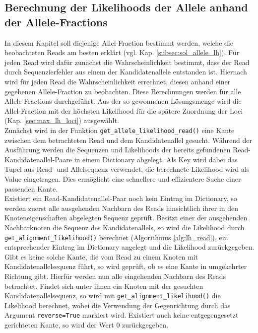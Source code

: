 \subsection{Berechnung der Likelihoods der Allele anhand der Allele-Fractions} \label{subsec:lh_allele}

In diesem Kapitel soll diejenige Allel-Fraction bestimmt werden, welche die beobachteten Reads am besten erklärt (vgl. Kap. \ref{subsec:sol_allele_lh}). Für jeden Read wird dafür zunächst die Wahrscheinlichkeit bestimmt, dass der Read durch Sequenzierfehler aus einem der Kandidatenallele entstanden ist. Hiernach wird für jeden Read die Wahrscheinlichkeit errechnet, diesen anhand einer gegebenen Allele-Fraction zu beobachten. Diese Berechnungen werden für alle Allele-Fractions durchgeführt. Aus der so gewonnenen Lösungsmenge wird die Allel-Fraction mit der höchsten Likelihood für die spätere Zuordnung der Loci (Kap. \ref{sec:max_lh_loci}) ausgewählt. \\ 

Zunächst wird in der Funktion \lstinline|get_allele_likelihood_read()| eine Kante zwischen dem betrachteten Read und dem Kandidatenallel gesucht. Während der Ausführung werden die Sequenzen und Likelihoods der bereits gefundenen Read-Kandidatenallel-Paare in einem Dictionary abgelegt. Als Key wird dabei das Tupel aus Read- und Allelsequenz verwendet, die berechnete Likelihood wird als Value eingetragen. Dies ermöglicht eine schnellere und effizientere Suche einer passenden Kante. \\

Existiert ein Read-Kandidatenallel-Paar noch kein Eintrag im Dictionary, so werden zuerst alle ausgehenden Nachbarn des Reads hinsichtlich ihrer in den Knoteneigenschaften abgelegten Sequenz geprüft. Besitzt einer der ausgehenden Nachbarknoten die Sequenz des Kandidatenallels, so wird die Likelihood durch \lstinline|get_alignment_likelihood()| berechnet (Algorithmus \ref{alg:lh_read}), ein entsprechender Eintrag im Dictionary angelegt und die Likelihood zurückgegeben.\\

Gibt es keine solche Kante, die vom Read zu einem Knoten mit Kandidatenallelsequenz führt, so wird geprüft, ob es eine Kante in umgekehrter Richtung gibt. Hierfür werden nun alle eingehenden Nachbarn des Reads betrachtet. Findet sich unter ihnen ein Knoten mit der gesuchten Kandidatenallelsequenz, so wird mit \lstinline|get_alignment_likelihood()| die Likelihood berechnet, wobei die Verwendung der Gegenrichtung durch das Argument \lstinline|reverse=True| markiert wird. Existiert auch keine entgegengesetzt gerichteten Kante, so wird der Wert $0$ zurückgegeben.\\

